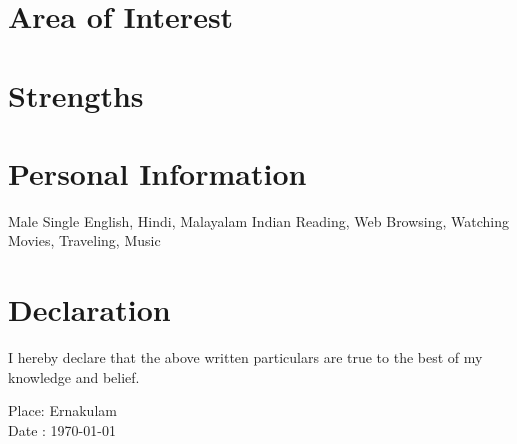 \documentclass[5pt,a4paper]{moderncv}
\begin{document}
\section{Area of Interest}
\begin{itemize}
\end{itemize}


\section{Strengths}


\section{Personal Information}
 {Male}
 {Single}
 {English, Hindi, Malayalam}
 {Indian}
 {Reading, Web Browsing, Watching Movies, Traveling, Music}


\section{Declaration}
\cvline{} {I hereby declare that the above written particulars are true to the best of my knowledge and belief.}


\vspace{.5cm}
Place: Ernakulam \\
Date : \today
\end{document}
